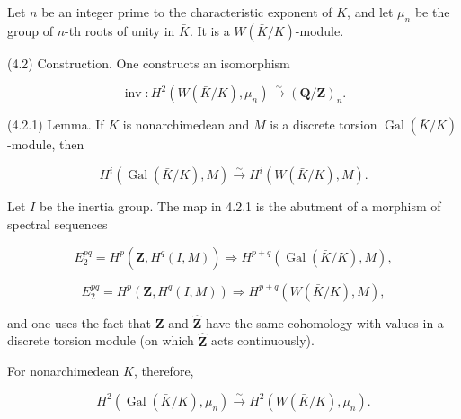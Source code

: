 \documentclass[9pt,twoside]{extarticle}
\begin{document}
{Let \(n\) be an integer prime to the characteristic exponent of \(K\), and let \(\mu_n\) be the group of \(n\)-th roots of unity in \(\bar K\). It is a \(W(\bar K/K)\)-module.\par

(4.2) Construction. One constructs an isomorphism\par

\[
\operatorname{inv}:H^2(W(\bar K/K),\mu_n)\xrightarrow{\sim}(\mathbf Q/\mathbf Z)_n.
\]

(4.2.1) Lemma. If \(K\) is nonarchimedean and \(M\) is a discrete torsion \(\operatorname{Gal}(\bar K/K)\)-module, then\par

\[
H^i(\operatorname{Gal}(\bar K/K),M)\xrightarrow{\sim}H^i(W(\bar K/K),M).
\]

Let \(I\) be the inertia group. The map in 4.2.1 is the abutment of a morphism of spectral sequences\par

\[
E_2^{pq}=H^p(\widehat{\mathbf Z},H^q(I,M))\Rightarrow H^{p+q}(\operatorname{Gal}(\bar K/K),M),
\]

\[
E_2^{pq}=H^p(\mathbf Z,H^q(I,M))\Rightarrow H^{p+q}(W(\bar K/K),M),
\]

and one uses the fact that \(\mathbf Z\) and \(\widehat{\mathbf Z}\) have the same cohomology with values in a discrete torsion module (on which \(\widehat{\mathbf Z}\) acts continuously).\par

For nonarchimedean \(K\), therefore,\par

\[
H^2(\operatorname{Gal}(\bar K/K),\mu_n)\xrightarrow{\sim}H^2(W(\bar K/K),\mu_n).
\]
}
\end{document}
